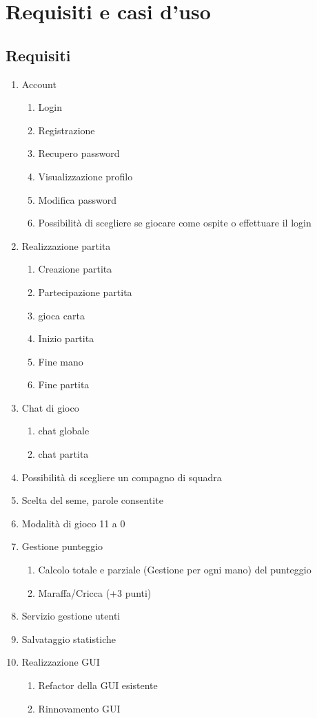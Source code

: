 \section{Requisiti e casi d'uso}
\subsection{Requisiti}
\begin{enumerate}
    \item Account
        \begin{enumerate}
            \item Login
            \item Registrazione
            \item Recupero password
            \item Visualizzazione profilo
            \item Modifica password
            \item Possibilità di scegliere se giocare come ospite o effettuare il login
        \end{enumerate}
    \item Realizzazione partita
        \begin{enumerate}
            \item Creazione partita
            \item Partecipazione partita
            \item gioca carta
            \item Inizio partita
            \item Fine mano
            \item Fine partita
        \end{enumerate}
    \item Chat di gioco
        \begin{enumerate}
            \item chat globale
            \item chat partita
        \end{enumerate}
    \item Possibilità di scegliere un compagno di squadra
    \item Scelta del seme, parole consentite
    \item Modalità di gioco 11 a 0
    \item Gestione punteggio
        \begin{enumerate}
            \item Calcolo totale e parziale (Gestione per ogni mano) del punteggio
            \item Maraffa/Cricca (+3 punti)
        \end{enumerate}
    \item Servizio gestione utenti
    \item Salvataggio statistiche
    \item Realizzazione GUI
        \begin{enumerate}
            \item Refactor della GUI esistente
            \item Rinnovamento GUI
        \end{enumerate}
\end{enumerate}
